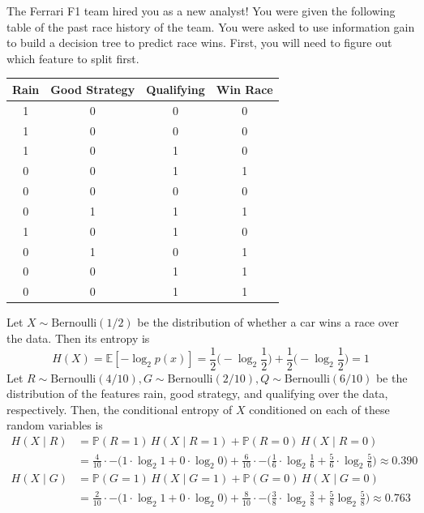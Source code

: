 \documentclass{article}
\begin{document}
    \begin{example}
    The Ferrari F1 team hired you as a new analyst! You were given the following table of the past race history of the team. You were asked to use information gain to build a decision tree to predict race wins. First, you will need to figure out which feature to split first. 

    \begin{center}
    \begin{tabular}[c]{c|c|c||c}
    Rain & Good Strategy & Qualifying & Win Race \\ \hline
    1 & 0 & 0 & 0 \\
    1 & 0 & 0 & 0 \\
    1 & 0 & 1 & 0 \\
    0 & 0 & 1 & 1 \\
    0 & 0 & 0 & 0 \\
    0 & 1 & 1 & 1 \\
    1 & 0 & 1 & 0 \\
    0 & 1 & 0 & 1 \\
    0 & 0 & 1 & 1 \\
    0 & 0 & 1 & 1 \\
    \end{tabular}
    \end{center}
    Let $X \sim \mathrm{Bernoulli}(1/2)$ be the distribution of whether a car wins a race over the data. Then its entropy is 
    \[H(X) = \mathbb{E}[-\log_2 p(x)] = \frac{1}{2} \big( -\log_2 \frac{1}{2} \big) + \frac{1}{2} \big( -\log_2 \frac{1}{2} \big) = 1\]
    Let $R \sim \mathrm{Bernoulli}(4/10), G \sim \mathrm{Bernoulli}(2/10), Q \sim \mathrm{Bernoulli}(6/10)$ be the distribution of the features rain, good strategy, and qualifying over the data, respectively. Then, the conditional entropy of $X$ conditioned on each of these random variables is 
    \begin{align*}
        H(X \mid R) & = \mathbb{P}(R = 1)\, H(X \mid R = 1) + \mathbb{P}(R = 0) \, H(X \mid R = 0) \\
        & = \frac{4}{10} \cdot - \big( 1 \cdot \log_2 1 + 0 \cdot \log_2 0 \big) + \frac{6}{10} \cdot - \big( \frac{1}{6} \cdot \log_2 \frac{1}{6} + \frac{5}{6} \cdot \log_2 \frac{5}{6} \big) \approx 0.390 \\
        H(X \mid G) & =  \mathbb{P}(G = 1)\, H(X \mid G = 1) + \mathbb{P}(G = 0) \, H(X \mid G = 0) \\
        & = \frac{2}{10} \cdot - \big( 1 \cdot \log_2 1 + 0 \cdot \log_2 0 \big) + \frac{8}{10} \cdot - \big( \frac{3}{8} \cdot \log_2 \frac{3}{8} + \frac{5}{8} \log_2 \frac{5}{8} \big) \approx 0.763\\

\end{align*}
\end{example}
\end{document}
